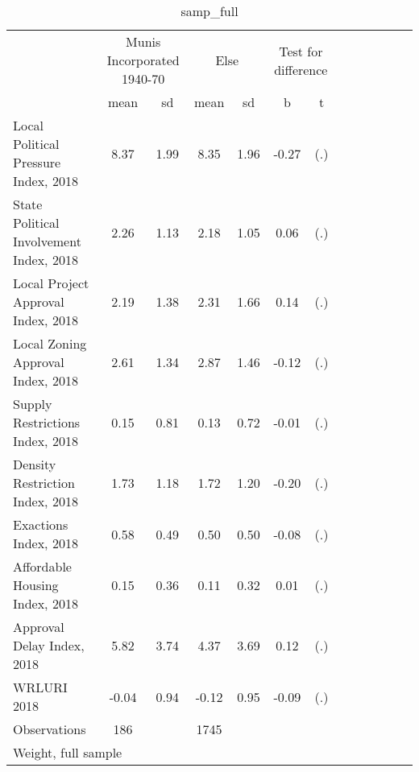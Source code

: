 \begin{table}[htbp]\centering
\def\sym#1{\ifmmode^{#1}\else\(^{#1}\)\fi}
\caption{samp\_full \label{tab1}}
\begin{tabular}{l*{3}{cccc}}
\toprule
                    &\multicolumn{2}{c}{Munis Incorporated 1940-70}&\multicolumn{2}{c}{Else} &\multicolumn{2}{c}{Test for difference}\\
                    &        mean&          sd&        mean&          sd&           b         &           t\\
\midrule
Local Political Pressure Index, 2018&        8.37&        1.99&        8.35&        1.96&       -0.27         &         (.)\\
State Political Involvement Index, 2018&        2.26&        1.13&        2.18&        1.05&        0.06         &         (.)\\
Local Project Approval Index, 2018&        2.19&        1.38&        2.31&        1.66&        0.14         &         (.)\\
Local Zoning Approval Index, 2018&        2.61&        1.34&        2.87&        1.46&       -0.12         &         (.)\\
Supply Restrictions Index, 2018&        0.15&        0.81&        0.13&        0.72&       -0.01         &         (.)\\
Density Restriction Index, 2018&        1.73&        1.18&        1.72&        1.20&       -0.20         &         (.)\\
Exactions Index, 2018&        0.58&        0.49&        0.50&        0.50&       -0.08         &         (.)\\
Affordable Housing Index, 2018&        0.15&        0.36&        0.11&        0.32&        0.01         &         (.)\\
Approval Delay Index, 2018&        5.82&        3.74&        4.37&        3.69&        0.12         &         (.)\\
WRLURI 2018         &       -0.04&        0.94&       -0.12&        0.95&       -0.09         &         (.)\\
\midrule
Observations        &         186&            &        1745&            &                     &            \\
\bottomrule
\multicolumn{7}{l}{\footnotesize Weight, full sample}\\
\end{tabular}
\end{table}
